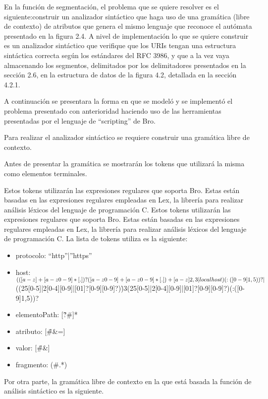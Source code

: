 En la función de segmentación, el problema que se quiere resolver es el siguiente:construir un analizador sintáctico que haga uso de una gramática (libre de contexto) de atributos que genera el mismo lenguaje que reconoce el autómata presentado en la figura 2.4. A nivel de implementación lo que se quiere construir es un analizador sintáctico que verifique que los URIs tengan una estructura sintáctica correcta según los estándares del RFC 3986, y que a la vez vaya almacenando los segmentos, delimitados por los delimitadores presentados en la sección 2.6, en la estructura de datos de la figura 4.2,
detallada en la sección 4.2.1.

A continuación se presentara la forma en que se modeló y se implementó el problema presentado con anterioridad haciendo uso de las herramientas presentadas por el lenguaje de ``scripting'' de Bro.

Para realizar el analizador sintáctico se requiere construir una gramática libre de contexto.

Antes de presentar la gramática se mostrarán los tokens que utilizará la misma como elementos terminales.

Estos tokens utilizarán las expresiones regulares que soporta Bro. Estas están basadas en las expresiones regulares empleadas en Lex, la librería para realizar análisis léxicos del lenguaje de programación C. Estos tokens utilizarán las expresiones regulares que soporta Bro. Estas están basadas en
las expresiones regulares empleadas en Lex, la librería para realizar análisis léxicos del lenguaje de programación C.
La lista de tokens utiliza es la siguiente:

\begin{itemize}
\item protocolo: “http”|”https”
\item host: $(([a-z]+[a-z0-9\-]*[.])?([a-z0-9]+[a-z0-9\-]*[.])+[a-z]{2,3}|localhost)(:([0-9]{1,5}))?|$\\ ((25[0-5]|2[0-4][0-9]|[01]?[0-9][0-9]?)\.){3}(25[0-5]|2[0-4][0-9]|[01]?[0-9][0-9]?)(:([0-9]{1,5}))?
\item elementoPath: [\^?\#]*
\item atributo: [\^\#\&=]
\item valor: [\^\#\&]
\item fragmento: (\#.*)
\end{itemize}

Por otra parte, la gramática libre de contexto en la que está basada la función de análisis sintáctico es la siguiente.

